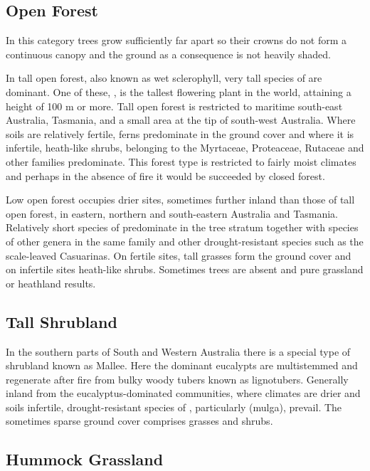 \subsection{Open Forest}

In this category trees grow sufficiently far apart so their crowns do not form a continuous canopy and the ground as a consequence is not heavily shaded.

In tall open forest, also known as wet sclerophyll, very tall species of  are dominant.
One of these, , is the tallest flowering plant in the world, attaining a height of 100 m or more.
Tall open forest is restricted to maritime south-east Australia, Tasmania, and a small area at the tip of south-west Australia.
Where soils are relatively fertile, ferns predominate in the ground cover and where it is infertile, heath-like shrubs, belonging to the Myrtaceae, Proteaceae, Rutaceae and other families predominate.
This forest type is restricted to fairly moist climates and perhaps in the absence of fire it would be succeeded by closed forest.

Low open forest occupies drier sites, sometimes further inland than those of tall open forest, in eastern, northern and south-eastern Australia and Tasmania.
Relatively short species of  predominate in the tree stratum together with species of other genera in the same family and other drought-resistant species such as the scale-leaved Casuarinas.
On fertile sites, tall grasses form the ground cover and on infertile sites heath-like shrubs.
Sometimes trees are absent and pure grassland or heathland results.

\subsection{Tall Shrubland}

In the southern parts of South and Western Australia there is a special type of shrubland known as Mallee.
Here the dominant eucalypts are multistemmed and regenerate after fire from bulky woody tubers known as lignotubers.
Generally inland from the eucalyptus-dominated communities, where climates are drier and soils infertile, drought-resistant species of , particularly  (mulga), prevail.
The sometimes sparse ground cover comprises grasses and shrubs.

\subsection{Hummock Grassland}

